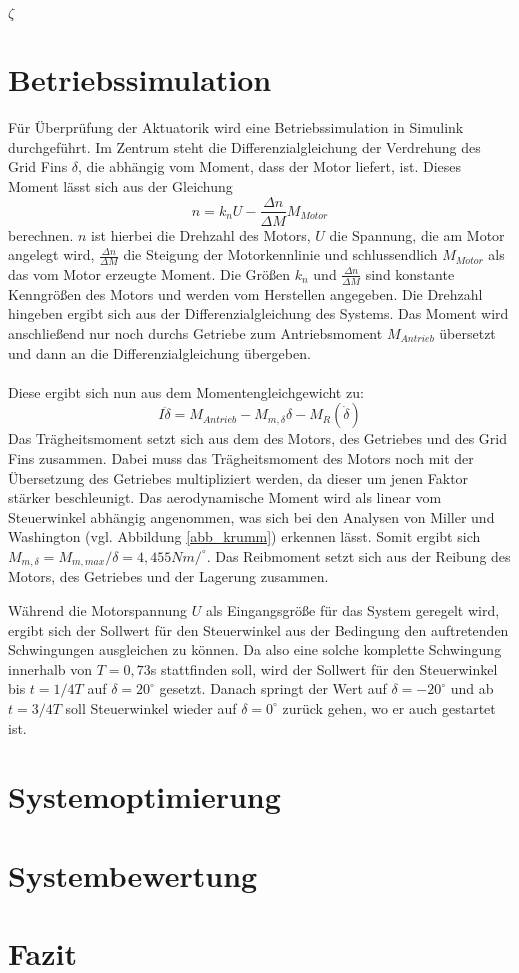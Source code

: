 $\zeta$
\section{Betriebssimulation}
Für Überprüfung der Aktuatorik wird eine Betriebssimulation in Simulink durchgeführt.
Im Zentrum steht die Differenzialgleichung der Verdrehung des Grid Fins $\delta$, die abhängig vom Moment, dass der Motor liefert, ist. Dieses Moment lässt sich aus der Gleichung
\begin{equation}
	n =k_nU-\frac{\Delta n}{\Delta M}M_{Motor}
\end{equation}
berechnen. $n$ ist hierbei die Drehzahl des Motors, $U$ die Spannung, die am Motor angelegt wird, $\frac{\Delta n}{\Delta M}$ die Steigung der Motorkennlinie und schlussendlich $M_{Motor}$ als das vom Motor erzeugte Moment. Die Größen $k_n$ und $\frac{\Delta n}{\Delta M}$ sind konstante Kenngrößen des Motors und werden vom Herstellen angegeben. Die Drehzahl hingeben ergibt sich aus der Differenzialgleichung des Systems. Das Moment wird anschließend nur noch durchs Getriebe zum Antriebsmoment $M_{Antrieb}$ übersetzt und dann an die Differenzialgleichung übergeben.
\\~\\
Diese ergibt sich nun aus dem Momentengleichgewicht zu:
\begin{equation}
	I\ddot{\delta} = M_{Antrieb} - M_{m, \delta}\delta - M_{R}(\dot{\delta})
\end{equation}
Das Trägheitsmoment setzt sich aus dem des Motors, des Getriebes und des Grid Fins zusammen. Dabei muss das Trägheitsmoment des Motors noch mit der Übersetzung des Getriebes multipliziert werden, da dieser um jenen Faktor stärker beschleunigt. Das aerodynamische Moment wird als linear vom Steuerwinkel abhängig angenommen, was sich bei den Analysen von Miller und Washington \cite{synopsis} (vgl. Abbildung \ref{abb_krumm}) erkennen lässt. Somit ergibt sich $M_{m, \delta} = M_{m, max}/\delta = 4,455Nm/^\circ$. Das Reibmoment setzt sich aus der Reibung des Motors, des Getriebes und der Lagerung zusammen.

Während die Motorspannung $U$ als Eingangsgröße für das System geregelt wird, ergibt sich der Sollwert für den Steuerwinkel aus der Bedingung den auftretenden Schwingungen ausgleichen zu können. Da also eine solche komplette Schwingung innerhalb von $T = 0,73$s stattfinden soll, wird der Sollwert für den Steuerwinkel bis $t = 1/4T$ auf $\delta = 20^\circ$ gesetzt. Danach springt der Wert auf $\delta = -20^\circ$ und ab $t = 3/4T$ soll Steuerwinkel wieder auf $\delta = 0^\circ$ zurück gehen, wo er auch gestartet ist.
\section{Systemoptimierung}

\section{Systembewertung}

\section{Fazit}